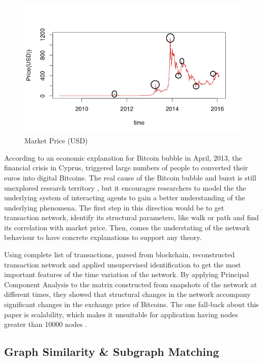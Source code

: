 \documentclass[12pt,a4paper]{article}
\numberwithin{equation}{section}
\numberwithin{figure}{section}
\numberwithin{table}{section}
\begin{document}
\begin{figure}[ht]
\begin{center}
\includegraphics[width=\textwidth]{./figure/bubble.png}
\caption{Market Price (USD)}
\label{fig:bubble}
\end{center}
\end{figure} 

According to an economic explanation \citep{Lo2014, Kristoufek2015} for Bitcoin bubble in April, 2013, the financial crisis in Cyprus, triggered large numbers of people to converted their euros into digital Bitcoins. The real cause of the Bitcoin bubble and burst is still unexplored research territory , but it encourages researchers to model the the underlying system of interacting agents to gain a better understanding of the underlying phenomena. The first step in this direction would be to get transaction network, identify its structural parameters, like walk or path and find its correlation with market price. Then, comes the understating of the network behaviour to have concrete explanations to support any theory.

Using complete list of transactions, parsed from blockchain, \citet{Kondor2014} reconstructed transaction network and applied unsupervised identification to get the most important features of the time variation of the network. By applying Principal Component Analysis to the matrix constructed from
snapshots of the network at different times, they showed that structural changes in the network accompany significant changes in the exchange price of Bitcoins. The one fall-back about this paper is scalability, which makes it unsuitable for application having nodes greater than 10000 nodes \citep{Zager2008}.



\subsection{Graph Similarity \& Subgraph Matching}
\label{subsec: Graph Similarity}
\end{document}
